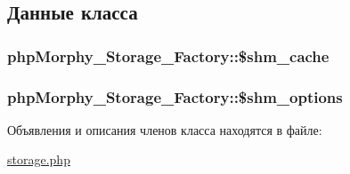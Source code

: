\subsection{Данные класса}
\hypertarget{classphpMorphy__Storage__Factory_a790271d899e8de99f0f348ab2041eb8d}{
\subsubsection[{\$shm\_\-cache}]{\setlength{\rightskip}{0pt plus 5cm}phpMorphy\_\-Storage\_\-Factory::\$shm\_\-cache}}
\label{classphpMorphy__Storage__Factory_a790271d899e8de99f0f348ab2041eb8d}
\hypertarget{classphpMorphy__Storage__Factory_a5890d822f98dc68c8d71ee7d4d5b570b}{
\subsubsection[{\$shm\_\-options}]{\setlength{\rightskip}{0pt plus 5cm}phpMorphy\_\-Storage\_\-Factory::\$shm\_\-options}}
\label{classphpMorphy__Storage__Factory_a5890d822f98dc68c8d71ee7d4d5b570b}


Объявления и описания членов класса находятся в файле:\begin{DoxyCompactItemize}
\item 
\hyperlink{storage_8php}{storage.php}\end{DoxyCompactItemize}
